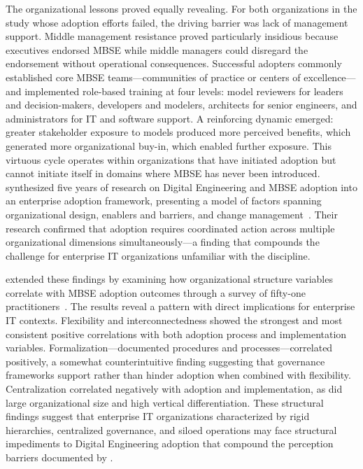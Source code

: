 The organizational lessons proved equally revealing. For both organizations in the study whose adoption efforts failed, the driving barrier was lack of management support. Middle management resistance proved particularly insidious because executives endorsed MBSE while middle managers could disregard the endorsement without operational consequences. Successful adopters commonly established core MBSE teams---communities of practice or centers of excellence---and implemented role-based training at four levels: model reviewers for leaders and decision-makers, developers and modelers, architects for senior engineers, and administrators for IT and software support. A reinforcing dynamic emerged: greater stakeholder exposure to models produced more perceived benefits, which generated more organizational buy-in, which enabled further exposure. This virtuous cycle operates within organizations that have initiated adoption but cannot initiate itself in domains where MBSE has never been introduced. \citeauthor{McDermott_2024} synthesized five years of research on Digital Engineering and MBSE adoption into an enterprise adoption framework, presenting a model of factors spanning organizational design, enablers and barriers, and change management~\parencite{McDermott_2024}. Their research confirmed that adoption requires coordinated action across multiple organizational dimensions simultaneously---a finding that compounds the challenge for enterprise IT organizations unfamiliar with the discipline.

\citeauthor{Henderson_Salado_2024_Org} extended these findings by examining how organizational structure variables correlate with MBSE adoption outcomes through a survey of fifty-one practitioners~\parencite{Henderson_Salado_2024_Org}. The results reveal a pattern with direct implications for enterprise IT contexts. Flexibility and interconnectedness showed the strongest and most consistent positive correlations with both adoption process and implementation variables. Formalization---documented procedures and processes---correlated positively, a somewhat counterintuitive finding suggesting that governance frameworks support rather than hinder adoption when combined with flexibility. Centralization correlated negatively with adoption and implementation, as did large organizational size and high vertical differentiation. These structural findings suggest that enterprise IT organizations characterized by rigid hierarchies, centralized governance, and siloed operations may face structural impediments to Digital Engineering adoption that compound the perception barriers documented by \citeauthor{Call_2024}.

